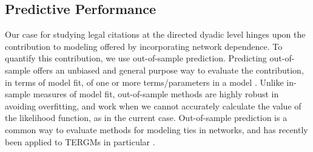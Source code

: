 \documentclass[headsepline=true, abstracton]{scrartcl}
\begin{document}






  
  
\subsection{Predictive Performance}

Our case for studying legal citations at the directed dyadic level hinges upon the contribution to modeling offered by incorporating network dependence. To quantify this contribution, we use out-of-sample prediction. Predicting out-of-sample offers an unbiased and general purpose way to evaluate the contribution, in terms of model fit, of one or more terms/parameters in a model \citep{jensen2000multiple,ward2010perils}. Unlike in-sample measures of model fit, out-of-sample methods are highly robust in avoiding overfitting, and work when we cannot accurately calculate the value of the likelihood function, as in the current case. Out-of-sample prediction is a common way to evaluate methods for modeling ties in networks, and has recently been applied to TERGMs in particular \citep{desmarais2013forecasting,cranmer2017can}.
\end{document}
